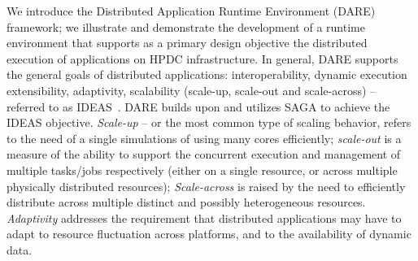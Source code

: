 \documentclass[]{svjour3}
\begin{document}



We introduce the Distributed Application Runtime Environment (DARE)
framework; we illustrate and demonstrate the development of a runtime
environment that supports as a primary design objective the
distributed execution of applications on HPDC infrastructure.  In
general, DARE supports the general goals of distributed applications:
interoperability, dynamic execution %
extensibility, adaptivity, scalability (scale-up, scale-out and
scale-across) -- referred to as IDEAS~\cite{ideas}.  DARE builds upon
and utilizes SAGA to achieve the IDEAS objective.  {\it Scale-up} --
or the most common type of scaling behavior, refers to the need of a
single simulations of using many cores efficiently; {\it scale-out} is
a measure of the ability to support the concurrent execution and
management of multiple tasks/jobs respectively (either on a single
resource, or across multiple physically distributed resources); {\it
  Scale-across} is raised by the need to efficiently distribute across
multiple distinct and possibly heterogeneous resources. {\it
  Adaptivity} addresses the requirement that distributed applications
may have to adapt to resource fluctuation across platforms, and to the
availability of dynamic data.
\end{document}
